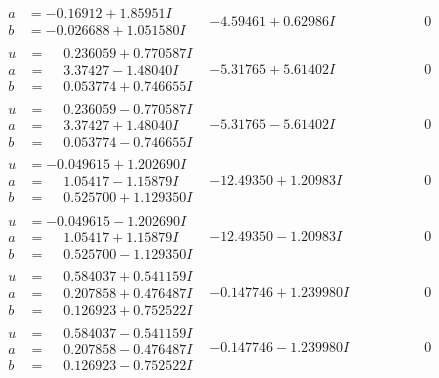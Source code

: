 \documentclass[1p]{elsarticle_modified}
\theoremstyle{definition}
\begin{document}
$$\begin{array}{c|c|c}
\begin{aligned}
a &= -0.16912 + 1.85951 I \\
b &= -0.026688 + 1.051580 I\end{aligned}
 & -4.59461 + 0.62986 I & \phantom{-0.000000 } 0 \\ \hline\begin{aligned}
u &= \phantom{-}0.236059 + 0.770587 I \\
a &= \phantom{-}3.37427 - 1.48040 I \\
b &= \phantom{-}0.053774 + 0.746655 I\end{aligned}
 & -5.31765 + 5.61402 I & \phantom{-0.000000 } 0 \\ \hline\begin{aligned}
u &= \phantom{-}0.236059 - 0.770587 I \\
a &= \phantom{-}3.37427 + 1.48040 I \\
b &= \phantom{-}0.053774 - 0.746655 I\end{aligned}
 & -5.31765 - 5.61402 I & \phantom{-0.000000 } 0 \\ \hline\begin{aligned}
u &= -0.049615 + 1.202690 I \\
a &= \phantom{-}1.05417 - 1.15879 I \\
b &= \phantom{-}0.525700 + 1.129350 I\end{aligned}
 & -12.49350 + 1.20983 I & \phantom{-0.000000 } 0 \\ \hline\begin{aligned}
u &= -0.049615 - 1.202690 I \\
a &= \phantom{-}1.05417 + 1.15879 I \\
b &= \phantom{-}0.525700 - 1.129350 I\end{aligned}
 & -12.49350 - 1.20983 I & \phantom{-0.000000 } 0 \\ \hline\begin{aligned}
u &= \phantom{-}0.584037 + 0.541159 I \\
a &= \phantom{-}0.207858 + 0.476487 I \\
b &= \phantom{-}0.126923 + 0.752522 I\end{aligned}
 & -0.147746 + 1.239980 I & \phantom{-0.000000 } 0 \\ \hline\begin{aligned}
u &= \phantom{-}0.584037 - 0.541159 I \\
a &= \phantom{-}0.207858 - 0.476487 I \\
b &= \phantom{-}0.126923 - 0.752522 I\end{aligned}
 & -0.147746 - 1.239980 I & \phantom{-0.000000 } 0 \\ \hline\begin{aligned}

\end{aligned}
\end{array}$$
\end{document}
